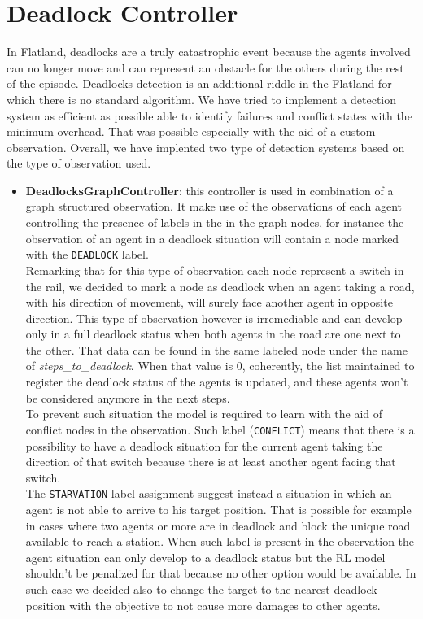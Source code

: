 \section{Deadlock Controller}
\label{sec:deadlockController}
In Flatland, deadlocks are a truly catastrophic event because the agents involved can no longer move and can represent an obstacle for the others during the rest of the episode. Deadlocks detection is an additional riddle in the Flatland for which there is no standard algorithm. We have tried to implement a detection system as efficient as possible able to identify failures and conflict states with the minimum overhead. That was possible especially with the aid of a custom observation. Overall, we have implented two type of detection systems based on the type of observation used.
\begin{itemize}
	\item \textbf{DeadlocksGraphController}: this controller is used in combination of a graph structured observation. It make use of the observations of each agent controlling the presence of labels in the in the graph nodes, for instance the observation of an agent in a deadlock situation will contain a node marked with the \texttt{DEADLOCK} label.\\ Remarking that for this type of observation each node represent a switch in the rail, we decided to mark a node as deadlock when an agent taking a road, with his direction of movement, will surely face another agent in opposite direction. This type of observation however is irremediable and can develop only in a full deadlock status when both agents in the road are one next to the other. That data can be found in the same labeled node under the name of \textit{steps\_to\_deadlock}. When that value is 0, coherently, the list maintained to register the deadlock status of the agents is updated, and these agents won't be considered anymore in the next steps.\\
	To prevent such situation the model is required to learn with the aid of conflict nodes in the observation. Such label (\texttt{CONFLICT}) means that there is a possibility to have a deadlock situation for the current agent taking the direction of that switch because there is at least another agent facing that switch.\\
	The \texttt{STARVATION} label assignment suggest instead a situation in which an agent is not able to arrive to his target position. That is possible for example in cases where two agents or more are in deadlock and block the unique road available to reach a station. When such label is present in the observation the agent situation can only develop to a deadlock status but the RL model shouldn't be penalized for that because no other option would be available. In such case we decided also to change the target to the nearest deadlock position with the objective to not cause more damages to other agents.

\end{itemize}
